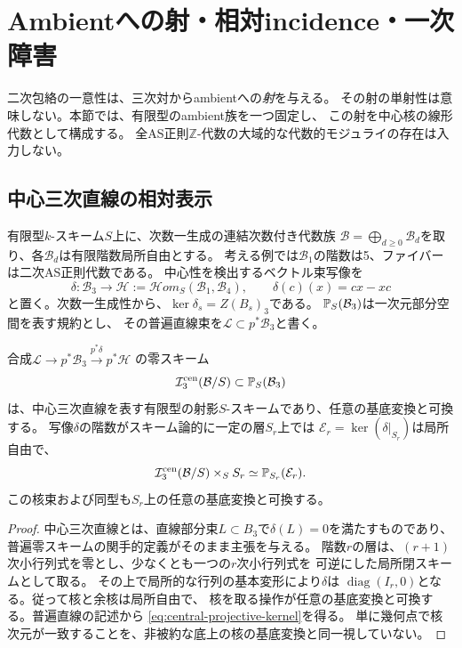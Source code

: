 \section{Ambientへの射・相対incidence・一次障害}
\label{sec:ambient-incidence}
二次包絡の一意性は、三次対からambientへの\emph{射}を与える。
その射の単射性は意味しない。本節では、有限型のambient族を一つ固定し、
この射を中心核の線形代数として構成する。
全AS正則$\mathbb Z$-代数の大域的な代数的モジュライの存在は入力しない。

\subsection{中心三次直線の相対表示}
有限型$k$-スキーム$S$上に、次数一生成の連結次数付き代数族
$\mathcal B=\bigoplus_{d\geq0}\mathcal B_d$を取り、各$\mathcal B_d$は有限階数局所自由とする。
考える例では$\mathcal B_1$の階数は5、ファイバーは二次AS正則代数である。
中心性を検出するベクトル束写像を
\begin{equation}\label{eq:central-commutator-map}
 \delta:\mathcal B_3\longrightarrow
 \mathcal H:=\mathcal Hom_S(\mathcal B_1,\mathcal B_4),
 \qquad \delta(c)(x)=cx-xc
\end{equation}
と置く。次数一生成性から、$\ker\delta_s=Z(B_s)_3$である。
$\mathbb P_S(\mathcal B_3)$は一次元部分空間を表す規約とし、
その普遍直線束を$\mathcal L\subset p^*\mathcal B_3$と書く。

\begin{proposition}[中心incidenceと基底変換]\label{prop:central-incidence-basechange}
合成$\mathcal L\to p^*\mathcal B_3\xrightarrow{p^*\delta}p^*\mathcal H$
の零スキーム
\begin{equation}\label{eq:central-incidence-definition}
 \mathcal I^{\mathrm{cen}}_3(\mathcal B/S)\subset\mathbb P_S(\mathcal B_3)
\end{equation}
は、中心三次直線を表す有限型の射影$S$-スキームであり、任意の基底変換と可換する。
写像$\delta$の階数がスキーム論的に一定の層$S_r$上では
$\mathcal E_r=\ker(\delta|_{S_r})$は局所自由で、
\begin{equation}\label{eq:central-projective-kernel}
 \mathcal I^{\mathrm{cen}}_3(\mathcal B/S)\times_S S_r
 \simeq\mathbb P_{S_r}(\mathcal E_r).
\end{equation}
この核束および同型も$S_r$上の任意の基底変換と可換する。
\end{proposition}
\begin{proof}
中心三次直線とは、直線部分束$L\subset B_3$で$\delta(L)=0$を満たすものであり、
普遍零スキームの関手的定義がそのまま主張を与える。
階数$r$の層は、$(r+1)$次小行列式を零とし、少なくとも一つの$r$次小行列式を
可逆にした局所閉スキームとして取る。
その上で局所的な行列の基本変形により$\delta$は
$\operatorname{diag}(I_r,0)$となる。従って核と余核は局所自由で、
核を取る操作が任意の基底変換と可換する。普遍直線の記述から
\eqref{eq:central-projective-kernel}を得る。
単に幾何点で核次元が一致することを、非被約な底上の核の基底変換と同一視していない。
\end{proof}

